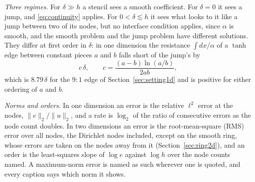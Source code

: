 \documentclass[11pt]{amsart}
\theoremstyle{definition}
\theoremstyle{remark}
\newcommand{\para}[1]{\par\smallskip\noindent\textit{#1}.\enspace}
\begin{document}
\para{Three regimes}
For $\delta \gg h$ a stencil sees a smooth coefficient. For $\delta = 0$ it
sees a jump, and \eqref{eq:continuity} applies. For $0 < \delta \lesssim h$
it sees what looks to it like a jump between two of its nodes, but no
interface condition applies, since $\alpha$ is smooth, and the smooth
problem and the jump problem have different solutions. They differ at
first order in $\delta$: in one dimension the resistance $\int dx / \alpha$
of a $\tanh$ edge between constant pieces $a$ and $b$ falls short of the
jump's by
\begin{equation}
  \label{eq:deficit}
  c\, \delta, \qquad c = \frac{(a - b) \ln (a / b)}{2 a b},
\end{equation}
which is $8.79\,\delta$ for the $9 : 1$ edge of Section~\ref{sec:setting1d}
and is positive for either ordering of $a$ and $b$.

\para{Norms and orders}
In one dimension an error is the relative $\ell^2$ error at the nodes,
$\|e\|_2 / \|u\|_2$, and a rate is $\log_2$ of the ratio of consecutive
errors as the node count doubles. In two dimensions an error is the
root-mean-square (RMS) error over all nodes, the Dirichlet nodes included,
except on the smooth ring, whose errors are taken on the nodes away from it
(Section~\ref{sec:ring2d}), and an order is the least-squares slope of $\log e$ against $\log h$ over
the node counts named. A maximum-norm error is named as such wherever one
is quoted, and every caption says which norm it shows.
\end{document}
